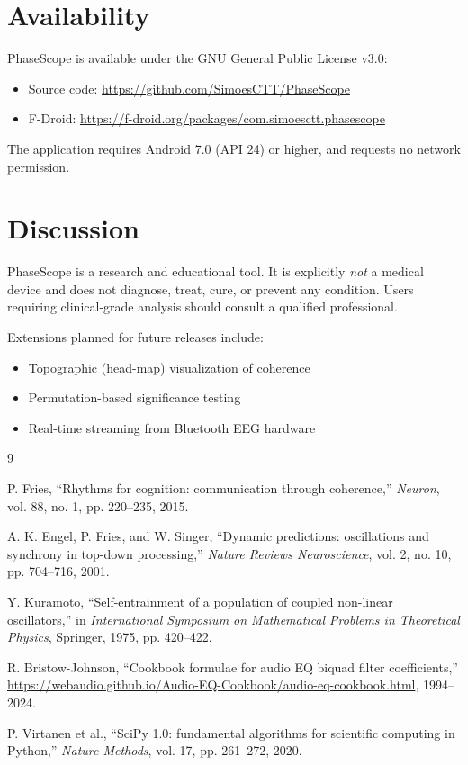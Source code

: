\documentclass[11pt,a4paper]{article}
\begin{document}
\section{Availability}

PhaseScope is available under the GNU General Public License v3.0:

\begin{itemize}
\item Source code: \url{https://github.com/SimoesCTT/PhaseScope}
\item F-Droid: \url{https://f-droid.org/packages/com.simoesctt.phasescope}
\end{itemize}

The application requires Android 7.0 (API 24) or higher, and requests no network permission.

\section{Discussion}

PhaseScope is a research and educational tool. It is explicitly \emph{not} a medical device and does not diagnose, treat, cure, or prevent any condition. Users requiring clinical-grade analysis should consult a qualified professional.

Extensions planned for future releases include:
\begin{itemize}
\item Topographic (head-map) visualization of coherence
\item Permutation-based significance testing
\item Real-time streaming from Bluetooth EEG hardware
\end{itemize}

\begin{thebibliography}{9}

P. Fries, ``Rhythms for cognition: communication through coherence,'' \emph{Neuron}, vol. 88, no. 1, pp. 220--235, 2015.

A. K. Engel, P. Fries, and W. Singer, ``Dynamic predictions: oscillations and synchrony in top-down processing,'' \emph{Nature Reviews Neuroscience}, vol. 2, no. 10, pp. 704--716, 2001.

Y. Kuramoto, ``Self-entrainment of a population of coupled non-linear oscillators,'' in \emph{International Symposium on Mathematical Problems in Theoretical Physics}, Springer, 1975, pp. 420--422.

R. Bristow-Johnson, ``Cookbook formulae for audio EQ biquad filter coefficients,'' \url{https://webaudio.github.io/Audio-EQ-Cookbook/audio-eq-cookbook.html}, 1994--2024.

P. Virtanen et al., ``SciPy 1.0: fundamental algorithms for scientific computing in Python,'' \emph{Nature Methods}, vol. 17, pp. 261--272, 2020.

\end{thebibliography}
\end{document}
